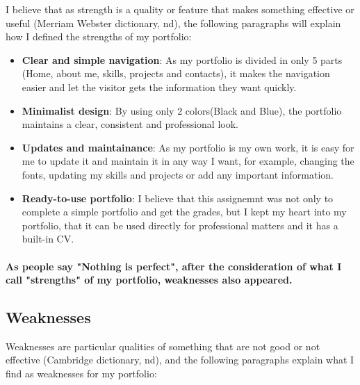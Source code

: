 \documentclass[12pt]{article}
\begin{document}
I believe that as strength is a quality or feature that makes something effective or useful (Merriam Webster dictionary, nd), the following paragraphs will explain how I defined the strengths of my portfolio:

\begin{itemize}

\item{\textbf{Clear and simple navigation}: As my portfolio is divided in only 5 parts (Home, about me, skills, projects and contacts), it makes the navigation easier and let the visitor gets the information they want quickly.}



\item{\textbf{Minimalist design}: By using only 2 colors(Black and Blue), the portfolio maintains a clear, consistent and professional look.}

\item{\textbf{Updates and maintainance}: As my portfolio is my own work, it is easy for me to update it and maintain it in any way I want, for example, changing the fonts, updating my skills and projects or add any important information.}

\item{\textbf{Ready-to-use portfolio}: I believe that this assignemnt was not only to complete a simple portfolio and get the grades, but I kept my heart into my portfolio, that it can be used directly for professional matters and it has a built-in CV.}

\end{itemize}

\paragraph{As people say "Nothing is perfect", after the consideration of what I call "strengths" of my portfolio, weaknesses also appeared.}

\subsection{Weaknesses}

Weaknesses are particular qualities of something that are not good or not effective (Cambridge dictionary, nd), and the following paragraphs explain what I find as weaknesses for my portfolio:
\end{document}
